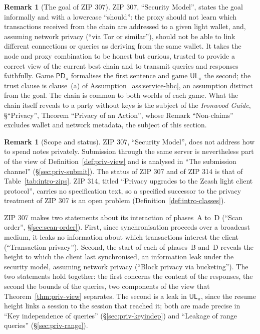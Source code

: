 \documentclass[11pt,a4paper]{article}
\theoremstyle{definition}
\newtheorem{remark}[theorem]{Remark}
\begin{document}
\begin{remark}[The goal of ZIP 307]
ZIP 307, ``Security Model'', states the goal informally and with a
lowercase ``should'': the proxy should not learn which transactions
received from the chain are addressed to a given light wallet, and,
assuming network privacy (``via Tor or similar''), should not be able to
link different connections or queries as deriving from the same wallet.
It takes the node and proxy combination to be honest but curious, trusted
to provide a correct view of the current best chain and to transmit
queries and responses faithfully. Game $\mathsf{PD}_\pi$ formalises the
first sentence and game $\mathsf{UL}_\pi$ the second; the trust clause is
clause~(a) of Assumption~\ref{ass:service-hbc}, an assumption distinct from
the goal. The chain is common to both worlds of each game. What the chain
itself reveals to a party without keys is the subject of the
\emph{Ironwood Guide}, \S``Privacy'', Theorem ``Privacy of an Action'',
whose Remark ``Non-claims'' excludes wallet and network metadata, the
subject of this section.
\end{remark}

\begin{remark}[Scope and status]
ZIP 307, ``Security Model'', does not address how to spend notes
privately. Submission through the same server is nevertheless part of the
view of Definition~\ref{def:priv-view} and is analysed in ``The submission
channel'' (\S\ref{sec:priv-submit}). The status of ZIP 307 and of ZIP 314
is that of Table~\ref{tab:intro-zips}. ZIP 314, titled ``Privacy upgrades
to the Zcash light client protocol'', carries no specification text, so a
specified successor to the privacy treatment of ZIP 307 is an open problem
(Definition~\ref{def:intro-classes}).
\end{remark}

ZIP 307 makes two statements about its interaction of phases~A to~D
(``Scan order'', \S\ref{sec:scan-order}). First, since synchronisation
proceeds over a broadcast medium, it leaks no information about which
transactions interest the client (``Transaction privacy''). Second, the
start of each of phases~B and~D reveals the height to which the client
last synchronised, an information leak under the security model, assuming
network privacy (``Block privacy via bucketing''). The two statements hold
together: the first concerns the content of the responses, the second the
bounds of the queries, two components of the view that
Theorem~\ref{thm:priv-view} separates. The second is a leak in
$\mathsf{UL}_\pi$, since the resume height links a session to the session
that reached it; both are made precise in ``Key independence of queries''
(\S\ref{sec:priv-keyindep}) and ``Leakage of range queries''
(\S\ref{sec:priv-range}).
\end{document}
